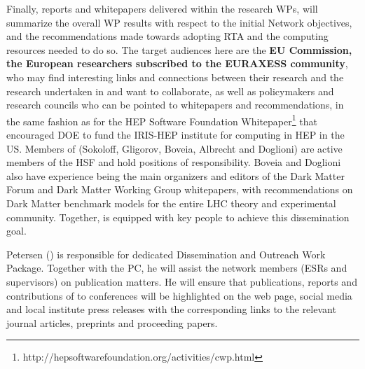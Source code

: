 Finally, reports and whitepapers delivered within the research WPs, will summarize the overall WP results with respect to the initial Network objectives, and the recommendations
made towards adopting RTA and the computing resources needed to do so. 
The target audiences here are the \textbf{EU Commission, the European researchers subscribed to the EURAXESS community}, who may find interesting links and connections between
their research and the research undertaken in \acronym and want to collaborate, as well as policymakers and research councils who can be pointed to whitepapers and recommendations, in the same fashion as for the HEP Software Foundation Whitepaper\footnote{http://hepsoftwarefoundation.org/activities/cwp.html} that encouraged DOE to fund the IRIS-HEP institute for computing in HEP in the US.  
Members of \acronym (Sokoloff, Gligorov, Boveia, Albrecht and Doglioni) are active members of the HSF and hold positions of responsibility.  
Boveia and Doglioni also have experience being the main organizers and editors of the Dark Matter Forum and Dark Matter Working Group whitepapers, with recommendations on Dark Matter benchmark models for the entire LHC theory and experimental community. 
Together, \acronym is equipped with  key people to achieve this dissemination goal. 

Petersen (\cernentity) is responsible for dedicated Dissemination and Outreach Work Package. 
Together with the PC, he will assist the network members (ESRs and supervisors) on publication matters. 
He will ensure that publications, reports and contributions of \acronym to conferences will be highlighted on the \acronym web page, social media and local institute press releases with the corresponding links to the relevant journal articles, preprints and proceeding papers.
